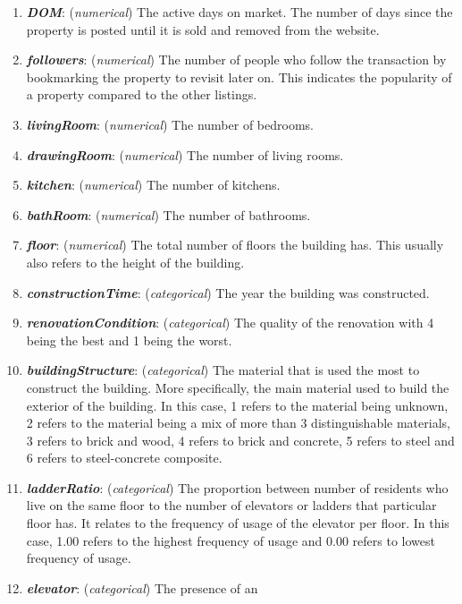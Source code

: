 \documentclass[
]{article}
\providecommand{\tightlist}{%
  \setlength{\itemsep}{0pt}\setlength{\parskip}{0pt}}
\begin{document}
\begin{enumerate}
\def\labelenumi{\arabic{enumi}.}
\tightlist
\item
  \textbf{\emph{DOM}}: (\emph{numerical}) The active days on market. The
  number of days since the property is posted until it is sold and
  removed from the website.
\item
  \textbf{\emph{followers}}: (\emph{numerical}) The number of people who
  follow the transaction by bookmarking the property to revisit later
  on. This indicates the popularity of a property compared to the other
  listings.
\item
  \textbf{\emph{livingRoom}}: (\emph{numerical}) The number of bedrooms.
\item
  \textbf{\emph{drawingRoom}}: (\emph{numerical}) The number of living
  rooms.
\item
  \textbf{\emph{kitchen}}: (\emph{numerical}) The number of kitchens.
\item
  \textbf{\emph{bathRoom}}: (\emph{numerical}) The number of bathrooms.
\item
  \textbf{\emph{floor}}: (\emph{numerical}) The total number of floors
  the building has. This usually also refers to the height of the
  building.
\item
  \textbf{\emph{constructionTime}}: (\emph{categorical}) The year the
  building was constructed.
\item
  \textbf{\emph{renovationCondition}}: (\emph{categorical}) The quality
  of the renovation with 4 being the best and 1 being the worst.
\item
  \textbf{\emph{buildingStructure}}: (\emph{categorical}) The material
  that is used the most to construct the building. More specifically,
  the main material used to build the exterior of the building. In this
  case, 1 refers to the material being unknown, 2 refers to the material
  being a mix of more than 3 distinguishable materials, 3 refers to
  brick and wood, 4 refers to brick and concrete, 5 refers to steel and
  6 refers to steel-concrete composite.
\item
  \textbf{\emph{ladderRatio}}: (\emph{categorical}) The proportion
  between number of residents who live on the same floor to the number
  of elevators or ladders that particular floor has. It relates to the
  frequency of usage of the elevator per floor. In this case, 1.00
  refers to the highest frequency of usage and 0.00 refers to lowest
  frequency of usage.
\item
  \textbf{\emph{elevator}}: (\emph{categorical}) The presence of an

\end{enumerate}
\end{document}
